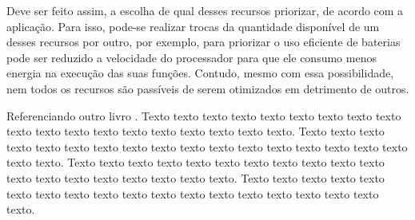 Deve ser feito assim, a escolha de qual desses recursos priorizar, de acordo com a aplicação. Para isso, pode-se realizar trocas da quantidade disponível de um desses recursos por outro, por exemplo, para priorizar o uso eficiente de baterias pode ser reduzido a velocidade do processador para que ele consumo menos energia na execução das suas funções. Contudo, mesmo com essa possibilidade, nem todos os recursos são passíveis de serem otimizados em detrimento de outros. \cite{white2011making}







    Referenciando outro livro \cite{LangtangenLogg2017}. Texto texto texto texto texto texto texto texto texto texto texto texto texto texto texto texto texto texto texto. Texto texto texto texto texto texto texto texto texto texto texto texto texto texto texto texto texto texto texto. Texto texto texto texto texto texto texto texto texto texto texto texto texto texto texto texto texto texto texto. Texto texto texto texto texto texto texto texto texto texto texto texto texto texto texto texto texto texto texto.

